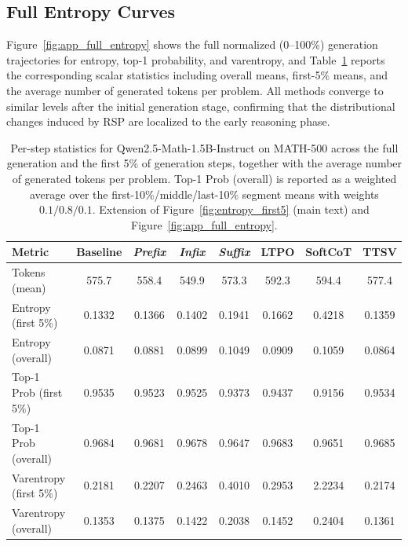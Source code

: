 \subsection{Full Entropy Curves}\label{app:entropy_full}

Figure~\ref{fig:app_full_entropy} shows the full normalized (0--100\%) generation trajectories for entropy, top-1 probability, and varentropy, and Table~\ref{tab:entropy_full} reports the corresponding scalar statistics including overall means, first-5\% means, and the average number of generated tokens per problem. All methods converge to similar levels after the initial generation stage, confirming that the distributional changes induced by RSP are localized to the early reasoning phase.

\begin{table}[H]
\centering
\caption{Per-step statistics for Qwen2.5-Math-1.5B-Instruct on MATH-500 across the full generation and the first 5\% of generation steps, together with the average number of generated tokens per problem. Top-1 Prob (overall) is reported as a weighted average over the first-10\%/middle/last-10\% segment means with weights $0.1/0.8/0.1$. Extension of Figure~\ref{fig:entropy_first5} (main text) and Figure~\ref{fig:app_full_entropy}.}
\label{tab:entropy_full}
\footnotesize
\setlength{\tabcolsep}{4pt}
\renewcommand{\arraystretch}{0.9}
\begin{tabular}{lccccccc}
\toprule
\textbf{Metric} & \textbf{Baseline} & \cellcolor{blue!10}\textbf{\emph{Prefix}} & \cellcolor{blue!10}\textbf{\emph{Infix}} & \cellcolor{blue!10}\textbf{\emph{Suffix}} & \textbf{LTPO} & \textbf{SoftCoT} & \textbf{TTSV} \\
\midrule
Tokens (mean)            & 575.7  & \cellcolor{blue!10}558.4  & \cellcolor{blue!10}549.9  & \cellcolor{blue!10}573.3  & 592.3  & 594.4  & 577.4  \\
\midrule
Entropy (first 5\%)      & 0.1332 & \cellcolor{blue!10}0.1366 & \cellcolor{blue!10}0.1402 & \cellcolor{blue!10}0.1941 & 0.1662 & 0.4218 & 0.1359 \\
Entropy (overall)        & 0.0871 & \cellcolor{blue!10}0.0881 & \cellcolor{blue!10}0.0899 & \cellcolor{blue!10}0.1049 & 0.0909 & 0.1059 & 0.0864 \\
\midrule
Top-1 Prob (first 5\%)   & 0.9535 & \cellcolor{blue!10}0.9523 & \cellcolor{blue!10}0.9525 & \cellcolor{blue!10}0.9373 & 0.9437 & 0.9156 & 0.9534 \\
Top-1 Prob (overall)     & 0.9684 & \cellcolor{blue!10}0.9681 & \cellcolor{blue!10}0.9678 & \cellcolor{blue!10}0.9647 & 0.9683 & 0.9651 & 0.9685 \\
\midrule
Varentropy (first 5\%)   & 0.2181 & \cellcolor{blue!10}0.2207 & \cellcolor{blue!10}0.2463 & \cellcolor{blue!10}0.4010 & 0.2953 & 2.2234 & 0.2174 \\
Varentropy (overall)     & 0.1353 & \cellcolor{blue!10}0.1375 & \cellcolor{blue!10}0.1422 & \cellcolor{blue!10}0.2038 & 0.1452 & 0.2404 & 0.1361 \\
\bottomrule
\end{tabular}
\end{table}

